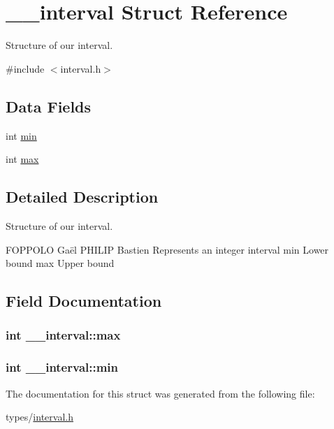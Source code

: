 \hypertarget{struct____interval}{}\section{\+\_\+\+\_\+interval Struct Reference}
\label{struct____interval}


Structure of our interval.  




{\ttfamily \#include $<$interval.\+h$>$}

\subsection*{Data Fields}
\begin{DoxyCompactItemize}
\item 
int \hyperlink{struct____interval_a4cf46cf956d26022cc0054bef0eb4a8f}{min}
\item 
int \hyperlink{struct____interval_a8d43a015044c83bcc61bd26017e5670c}{max}
\end{DoxyCompactItemize}


\subsection{Detailed Description}
Structure of our interval. 

F\+O\+P\+P\+O\+LO Gaël  P\+H\+I\+L\+IP Bastien Represents an integer interval  min Lower bound  max Upper bound 

\subsection{Field Documentation}
\subsubsection[{\texorpdfstring{max}{max}}]{\setlength{\rightskip}{0pt plus 5cm}int \+\_\+\+\_\+interval\+::max}\hypertarget{struct____interval_a8d43a015044c83bcc61bd26017e5670c}{}\label{struct____interval_a8d43a015044c83bcc61bd26017e5670c}
\subsubsection[{\texorpdfstring{min}{min}}]{\setlength{\rightskip}{0pt plus 5cm}int \+\_\+\+\_\+interval\+::min}\hypertarget{struct____interval_a4cf46cf956d26022cc0054bef0eb4a8f}{}\label{struct____interval_a4cf46cf956d26022cc0054bef0eb4a8f}


The documentation for this struct was generated from the following file\+:\begin{DoxyCompactItemize}
\item 
types/\hyperlink{interval_8h}{interval.\+h}\end{DoxyCompactItemize}
